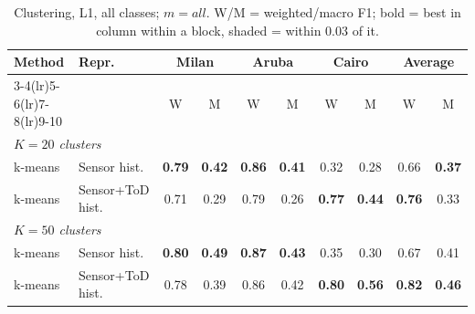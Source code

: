 \begin{table}[H]
\centering\small
\caption{Clustering, L1, all classes; $m=all$. W/M = weighted/macro F1; bold = best in column within a block, shaded = within 0.03 of it.}
\label{tab:clu_l1_all_mall}
\setlength{\tabcolsep}{3.5pt}
\begin{tabular}{llcc|cc|cc|cc}
\toprule
Method & Repr. & \multicolumn{2}{c}{Milan} & \multicolumn{2}{c}{Aruba} & \multicolumn{2}{c}{Cairo} & \multicolumn{2}{c}{Average} \\
\cmidrule(lr){3-4}\cmidrule(lr){5-6}\cmidrule(lr){7-8}\cmidrule(lr){9-10}
 & & W & M & W & M & W & M & W & M \\
\midrule
\multicolumn{10}{l}{\textit{$K = 20$ clusters}} \\
\midrule
k-means & Sensor hist. & \cellcolor{blue!12}\textbf{0.79} & \cellcolor{blue!12}\textbf{0.42} & \cellcolor{blue!12}\textbf{0.86} & \cellcolor{blue!12}\textbf{0.41} & 0.32 & 0.28 & 0.66 & \cellcolor{blue!12}\textbf{0.37} \\
k-means & Sensor+ToD hist. & 0.71 & 0.29 & 0.79 & 0.26 & \cellcolor{blue!12}\textbf{0.77} & \cellcolor{blue!12}\textbf{0.44} & \cellcolor{blue!12}\textbf{0.76} & 0.33 \\
\midrule
\multicolumn{10}{l}{\textit{$K = 50$ clusters}} \\
\midrule
k-means & Sensor hist. & \cellcolor{blue!12}\textbf{0.80} & \cellcolor{blue!12}\textbf{0.49} & \cellcolor{blue!12}\textbf{0.87} & \cellcolor{blue!12}\textbf{0.43} & 0.35 & 0.30 & 0.67 & 0.41 \\
k-means & Sensor+ToD hist. & \cellcolor{blue!12}0.78 & 0.39 & \cellcolor{blue!12}0.86 & \cellcolor{blue!12}0.42 & \cellcolor{blue!12}\textbf{0.80} & \cellcolor{blue!12}\textbf{0.56} & \cellcolor{blue!12}\textbf{0.82} & \cellcolor{blue!12}\textbf{0.46} \\
\bottomrule
\end{tabular}
\end{table}

